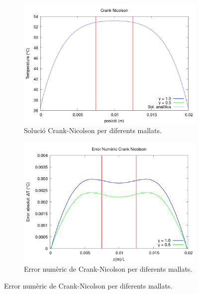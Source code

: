\documentclass[11pt]{article}
\begin{document}
\begin{figure}[hbt!]
    \centering
    \begin{subfigure}{0.3\textwidth}
        \centering
        \includegraphics[width=\textwidth]{cranc2gamma.png}
        \caption{Solució Crank-Nicolson per diferents mallats.}
        \label{fig:crank3gamma}
    \end{subfigure}
    \hspace{0.025\textwidth}
    \begin{subfigure}{0.3\textwidth}
        \centering
        \includegraphics[width=\textwidth]{errcranc2gamma.png}
        \caption{Error numèric de Crank-Nicolson per diferents mallats.}
        \label{fig:errcrank2gamma}
    \end{subfigure}
    \hspace{0.025\textwidth}

\end{figure}
\end{document}
